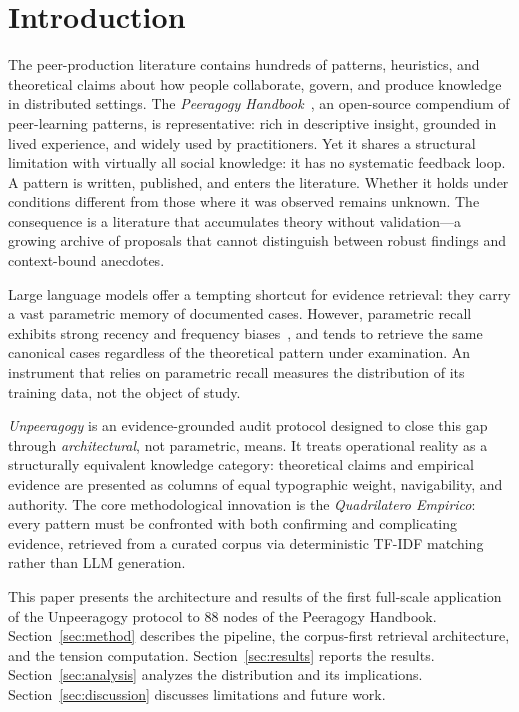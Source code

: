 \documentclass[10pt,twocolumn]{article}
\begin{document}
\section{Introduction}
\label{sec:intro}

The peer-production literature contains hundreds of patterns, heuristics, and theoretical claims about how people collaborate, govern, and produce knowledge in distributed settings. The \emph{Peeragogy Handbook}~\cite{peeragogy2016}, an open-source compendium of peer-learning patterns, is representative: rich in descriptive insight, grounded in lived experience, and widely used by practitioners. Yet it shares a structural limitation with virtually all social knowledge: it has no systematic feedback loop. A pattern is written, published, and enters the literature. Whether it holds under conditions different from those where it was observed remains unknown. The consequence is a literature that accumulates theory without validation---a growing archive of proposals that cannot distinguish between robust findings and context-bound anecdotes.

Large language models offer a tempting shortcut for evidence retrieval: they carry a vast parametric memory of documented cases. However, parametric recall exhibits strong recency and frequency biases~\cite{kandpal2024longtail}, and tends to retrieve the same canonical cases regardless of the theoretical pattern under examination. An instrument that relies on parametric recall measures the distribution of its training data, not the object of study.

\emph{Unpeeragogy} is an evidence-grounded audit protocol designed to close this gap through \emph{architectural}, not parametric, means. It treats operational reality as a structurally equivalent knowledge category: theoretical claims and empirical evidence are presented as columns of equal typographic weight, navigability, and authority. The core methodological innovation is the \emph{Quadrilatero Empirico}: every pattern must be confronted with both confirming and complicating evidence, retrieved from a curated corpus via deterministic TF-IDF matching rather than LLM generation.

This paper presents the architecture and results of the first full-scale application of the Unpeeragogy protocol to 88 nodes of the Peeragogy Handbook. Section~\ref{sec:method} describes the pipeline, the corpus-first retrieval architecture, and the tension computation. Section~\ref{sec:results} reports the results. Section~\ref{sec:analysis} analyzes the distribution and its implications. Section~\ref{sec:discussion} discusses limitations and future work.
\end{document}
